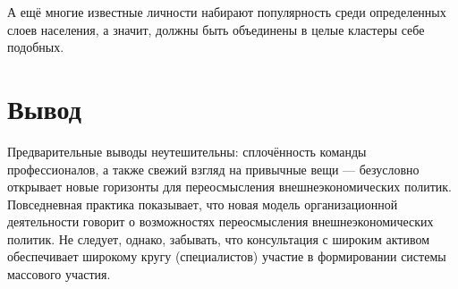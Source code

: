 А ещё многие известные личности набирают популярность среди определенных слоев населения, а значит, должны быть объединены в целые кластеры себе подобных.


\section{Вывод}
Предварительные выводы неутешительны: сплочённость команды профессионалов, а
также свежий взгляд на привычные вещи — безусловно открывает новые горизонты для
переосмысления внешнеэкономических политик. Повседневная практика показывает,
что новая модель организационной деятельности говорит о возможностях
переосмысления внешнеэкономических политик. Не следует, однако, забывать, что
консультация с широким активом обеспечивает широкому кругу (специалистов)
участие в формировании системы массового участия.

